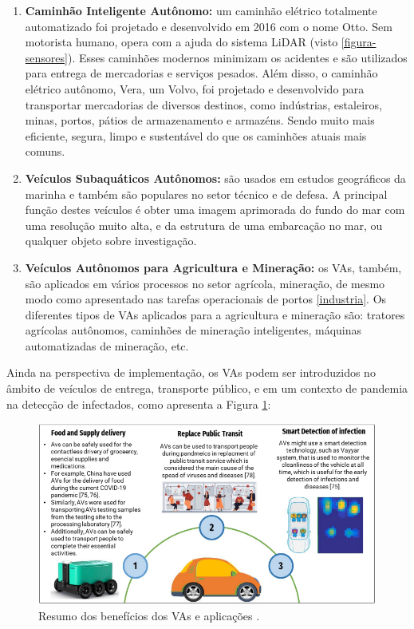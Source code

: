 \begin{enumerate}
\item \textbf{Caminhão Inteligente Autônomo:} um caminhão elétrico totalmente automatizado foi projetado e desenvolvido em 2016 com o nome Otto. Sem motorista humano, opera com a ajuda do sistema LiDAR (visto \ref{figura-sensores}). Esses caminhões modernos minimizam os acidentes e são utilizados para entrega de mercadorias e serviços pesados. Além disso, o caminhão elétrico autônomo, Vera, um Volvo, foi projetado e desenvolvido para transportar mercadorias de diversos destinos, como indústrias, estaleiros, minas, portos, pátios de armazenamento e armazéns. Sendo muito mais eficiente, segura, limpo e sustentável do que os caminhões atuais mais comuns.

\item \textbf{Veículos Subaquáticos Autônomos:} são usados em estudos geográficos da marinha e também são populares no setor técnico e de defesa. A principal função destes veículos é obter uma imagem aprimorada do fundo do mar com uma resolução muito alta, e da estrutura de uma embarcação no mar, ou qualquer objeto sobre investigação.
\item \textbf{Veículos Autônomos para Agricultura e Mineração:}  os VAs, também, são aplicados em vários processos no setor agrícola, mineração, de mesmo modo como apresentado nas tarefas operacionais de portos \ref{industria}. Os diferentes tipos de VAs aplicados para a agricultura e mineração são: tratores agrícolas autônomos, caminhões de mineração inteligentes, máquinas automatizadas de mineração, etc.

\end{enumerate}

Ainda na perspectiva de implementação, os VAs podem ser introduzidos no âmbito de veículos de entrega, transporte público, e em um contexto de pandemia na detecção de infectados, como apresenta a Figura \ref{resumo_aplic}:

\begin{figure}[H]
\centering
\includegraphics[width=\textwidth]{Figures/aplic.png}
\caption{Resumo dos benefícios dos VAs e aplicações \cite{mundobrasil}.}
\label{resumo_aplic}
\end{figure}

